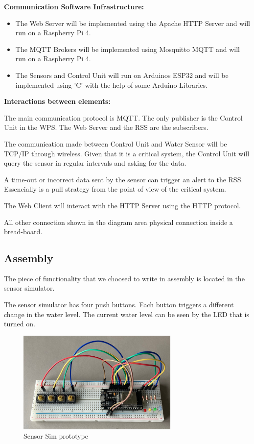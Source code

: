 \documentclass[11pt]{article}
\begin{document}
\textbf{Communication Software Infrastructure:}

\begin{itemize}
	\item The Web Server will be implemented using the Apache HTTP Server and will run on a Raspberry Pi 4.
	\item The MQTT Brokers will be implemented using Mosquitto MQTT and will run on a Raspberry Pi 4.
	\item The Sensors and Control Unit will run on Arduinos ESP32 and will be implemented using 'C' with the help of some Arduino Libraries. 
\end{itemize}

\textbf{Interactions between elements:}

The main communication protocol is MQTT. The only publisher is the Control Unit in the WPS. The Web Server and the RSS are the subscribers.

The communication made between Control Unit and Water Sensor will be TCP/IP through wireless. Given that it is a critical system, the Control Unit will query the sensor in regular intervals and asking for the data.

A time-out or incorrect data sent by the sensor can trigger an alert to the RSS. Essencially is a pull strategy from the point of view of the critical system.

The Web Client will interact with the HTTP Server using the HTTP protocol.

All other connection shown in the diagram area physical connection inside a bread-board.

\newpage
\subsection{Assembly}

The piece of functionality that we choosed to write in assembly is located in the sensor simulator.

The sensor simulator has four push buttons. Each button triggers a different change in the water level. 
The current water level can be seen by the LED that is turned on.

\begin{figure}[H]
  \centering
  \includegraphics[width=300px]{../diagrams/sensor-sim-01.jpg}
  \caption{Sensor Sim prototype}
  \label{fig:Sensor sim prototype}
\end{figure}
\end{document}
